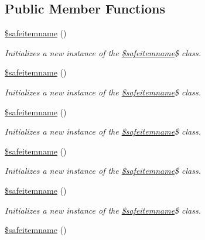 \subsection*{Public Member Functions}
\begin{DoxyCompactItemize}
\item 
\hyperlink{class_0Brootnamespace_1_1_0Bsafeitemname_abbf88d241ae254db33a6740dee265a73}{\$safeitemname} ()
\begin{DoxyCompactList}\small\item\em Initializes a new instance of the \hyperlink{class_0Brootnamespace_1_1_0Bsafeitemname}{\$safeitemname}\$ class. \end{DoxyCompactList}\item 
\hyperlink{class_0Brootnamespace_1_1_0Bsafeitemname_abbf88d241ae254db33a6740dee265a73}{\$safeitemname} ()
\begin{DoxyCompactList}\small\item\em Initializes a new instance of the \hyperlink{class_0Brootnamespace_1_1_0Bsafeitemname}{\$safeitemname}\$ class. \end{DoxyCompactList}\item 
\hyperlink{class_0Brootnamespace_1_1_0Bsafeitemname_abbf88d241ae254db33a6740dee265a73}{\$safeitemname} ()
\begin{DoxyCompactList}\small\item\em Initializes a new instance of the \hyperlink{class_0Brootnamespace_1_1_0Bsafeitemname}{\$safeitemname}\$ class. \end{DoxyCompactList}\item 
\hyperlink{class_0Brootnamespace_1_1_0Bsafeitemname_abbf88d241ae254db33a6740dee265a73}{\$safeitemname} ()
\begin{DoxyCompactList}\small\item\em Initializes a new instance of the \hyperlink{class_0Brootnamespace_1_1_0Bsafeitemname}{\$safeitemname}\$ class. \end{DoxyCompactList}\item 
\hyperlink{class_0Brootnamespace_1_1_0Bsafeitemname_abbf88d241ae254db33a6740dee265a73}{\$safeitemname} ()
\begin{DoxyCompactList}\small\item\em Initializes a new instance of the \hyperlink{class_0Brootnamespace_1_1_0Bsafeitemname}{\$safeitemname}\$ class. \end{DoxyCompactList}\item 
\hyperlink{class_0Brootnamespace_1_1_0Bsafeitemname_abbf88d241ae254db33a6740dee265a73}{\$safeitemname} ()

\end{DoxyCompactItemize}
